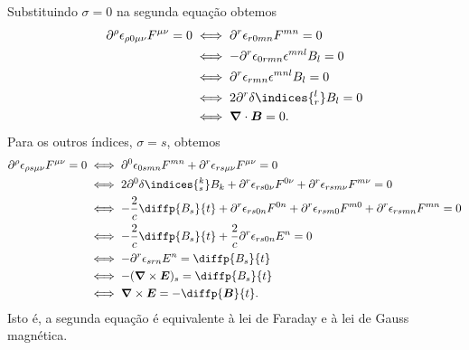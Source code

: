 Substituindo \(\sigma = 0\) na segunda equação obtemos
\begin{align*}
    \partial^\rho\epsilon_{\rho0\mu\nu}F^{\mu\nu}=0 &\iff \partial^r \epsilon_{r0mn}F^{mn} = 0\\
                                                    &\iff -\partial^r \epsilon_{0rmn} \epsilon^{mnl} B_l = 0\\
                                                    &\iff \partial^r \epsilon_{rmn}\epsilon^{mnl}B_l = 0\\
                                                    &\iff 2\partial^r \delta\indices{^l_r}B_l = 0\\
                                                    &\iff \boldsymbol\nabla\cdot\boldsymbol{B} = 0.
\end{align*}
Para os outros índices, \(\sigma = s\), obtemos
\begin{align*}
    \partial^\rho\epsilon_{\rho s\mu\nu}F^{\mu\nu}=0 & \iff \partial^0 \epsilon_{0smn} F^{mn} + \partial^r\epsilon_{rs\mu\nu}F^{\mu\nu} = 0\\
                                                     &\iff 2\partial^0 \delta\indices{^k_s} B_k + \partial^r \epsilon_{rs0\nu} F^{0\nu} + \partial^r \epsilon_{rsm\nu} F^{m\nu} = 0\\
                                                     &\iff - \frac2c \diffp{B_s}{t} + \partial^r \epsilon_{rs0n}F^{0n} + \partial^r \epsilon_{rsm0}F^{m0} + \partial^r \epsilon_{rsmn}F^{mn} = 0\\
                                                     &\iff - \frac2c \diffp{B_s}{t} + \frac2c\partial^r \epsilon_{rs0n}E^n = 0\\
                                                     &\iff - \partial^r \epsilon_{srn}E^n = \diffp{B_s}{t}\\
                                                     &\iff -(\boldsymbol\nabla\times \boldsymbol{E})_s = \diffp{B_s}{t}\\
                                                     &\iff \boldsymbol\nabla\times \boldsymbol{E} = - \diffp{\boldsymbol{B}}{t}.
\end{align*}
Isto é, a segunda equação é equivalente à lei de Faraday e à lei de Gauss magnética.

